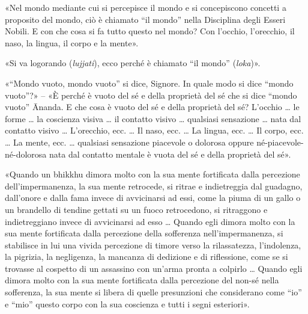
«Nel mondo mediante cui si percepisce il mondo e si concepiscono concetti a
proposito del mondo, ciò è chiamato “il mondo” nella Disciplina degli Esseri
Nobili. E con che cosa si fa tutto questo nel mondo? Con l’occhio, l’orecchio,
il naso, la lingua, il corpo e la mente».


«Si va logorando (\emph{lujjati}), ecco perché è chiamato “il mondo”
(\emph{loka})».


«“Mondo vuoto, mondo vuoto” si dice, Signore. In quale modo si dice “mondo
vuoto”?» – «È perché è vuoto del sé e della proprietà del sé che si dice “mondo
vuoto” Ānanda. E che cosa è vuoto del sé e della proprietà del sé? L’occhio … le
forme … la coscienza visiva … il contatto visivo … qualsiasi sensazione … nata
dal contatto visivo … L’orecchio, ecc. … Il naso, ecc. … La lingua, ecc. … Il
corpo, ecc. … La mente, ecc. … qualsiasi sensazione piacevole o dolorosa oppure
né-piacevole-né-dolorosa nata dal contatto mentale è vuota del sé e della
proprietà del sé».


«Quando un bhikkhu dimora molto con la sua mente fortificata dalla percezione
dell’impermanenza, la sua mente retrocede, si ritrae e indietreggia dal
guadagno, dall’onore e dalla fama invece di avvicinarsi ad essi, come la piuma
di un gallo o un brandello di tendine gettati su un fuoco retrocedono, si
ritraggono e indietreggiano invece di avvicinarsi ad esso … Quando egli dimora
molto con la sua mente fortificata dalla percezione della sofferenza
nell’impermanenza, si stabilisce in lui una vivida percezione di timore verso la
rilassatezza, l’indolenza, la pigrizia, la negligenza, la mancanza di dedizione
e di riflessione, come se si trovasse al cospetto di un assassino con un’arma
pronta a colpirlo … Quando egli dimora molto con la sua mente fortificata dalla
percezione del non-sé nella sofferenza, la sua mente si libera di quelle
presunzioni che considerano come “io” e “mio” questo corpo con la sua coscienza
e tutti i segni esteriori».


